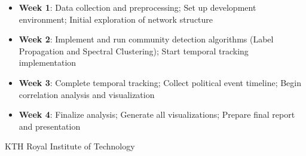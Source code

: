 \documentclass[11pt]{article}
\newcommand{\propitem}[1]{\noindent{\textbf{\color{kthblue}#1:} }}
\begin{document}
\propitem{Timeline}
\begin{itemize}
    \item \textbf{Week 1}: Data collection and preprocessing; Set up development environment; Initial exploration of network structure
    \item \textbf{Week 2}: Implement and run community detection algorithms (Label Propagation and Spectral Clustering); Start temporal tracking implementation
    \item \textbf{Week 3}: Complete temporal tracking; Collect political event timeline; Begin correlation analysis and visualization
    \item \textbf{Week 4}: Finalize analysis; Generate all visualizations; Prepare final report and presentation
\end{itemize}




\vspace{0.2cm}
\noindent\makebox[\linewidth]{\rule{\textwidth}{0.4pt}}
\begin{center}
\small{KTH Royal Institute of Technology}
\end{center}
\end{document}
